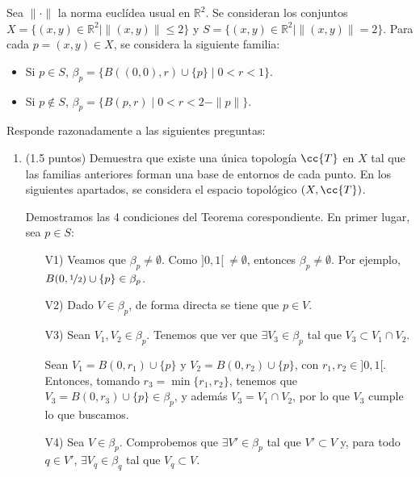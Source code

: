 \documentclass[12pt]{article}
\newcommand{\T}[0]{\cc{T}}
\begin{document}
    \begin{ejercicio}[5 puntos]
        Sea $\| \cdot \|$ la norma euclídea usual en $\mathbb{R}^2$. Se consideran los conjuntos
        $X = \{(x,y) \in \mathbb{R}^2 \mid \| (x,y) \| \leq 2\}$ y $S = \{(x,y) \in \mathbb{R}^2 \mid \| (x,y) \| = 2\}$.
        Para cada $p = (x,y) \in X$, se considera la siguiente familia:
        \begin{itemize}
          \item Si $p \in S$, $\beta_p = \{B((0,0), r) \cup \{p\} \mid 0 < r < 1\}$.
          \item Si $p \notin S$, $\beta_p = \{B(p,r) \mid 0 < r < 2 - \| p \|\}$.
        \end{itemize}
        Responde razonadamente a las siguientes preguntas:
        \begin{enumerate}
          \item(1.5 puntos) Demuestra que existe una única topología $\T$ en $X$ tal que las familias anteriores forman una base de entornos de cada punto. En los siguientes apartados, se considera el espacio topológico $(X,\T)$.
          
          Demostramos las 4 condiciones del Teorema corespondiente. En primer lugar, sea $p\in S$:
          \begin{enumerate}
            \item[V1)] Veamos que $\beta_p \neq \emptyset$. Como $]0,1[~\neq \emptyset$, entonces
            $\beta_p \neq \emptyset$. Por ejemplo, $B(0,\nicefrac{1}{2}) \cup \{p\} \in \beta_p$.

            \item[V2)] Dado $V\in \beta_p$, de forma directa se tiene que $p\in V$.
            
            \item[V3)] Sean $V_1, V_2 \in \beta_p$. Tenemos que ver que $\exists V_3\in \beta_p$ tal que
            $V_3 \subset V_1 \cap V_2$.

            Sean $V_1=B(0, r_1) \cup \{p\}$ y $V_2=B(0, r_2) \cup \{p\}$, con $r_1, r_2 \in ]0,1[$.
            Entonces, tomando $r_3 = \min\{r_1, r_2\}$, tenemos que $V_3=B(0, r_3) \cup \{p\} \in \beta_p$,
            y además $V_3 = V_1 \cap V_2$, por lo que $V_3$ cumple lo que buscamos.

            \item[V4)] Sea $V\in \beta_p$. Comprobemos que $\exists V'\in \beta_p$ tal que
            $V' \subset V$ y, para todo $q\in V'$, $\exists V_q\in \beta_q$ tal que $V_q \subset V$.


\end{enumerate}
\end{enumerate}
\end{ejercicio}
\end{document}
